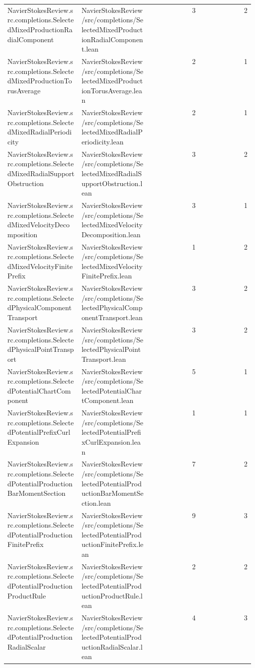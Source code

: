 \begin{longtable}{p{0.30\linewidth}p{0.28\linewidth}rr}
NavierStokesReview.src.completions.SelectedMixedProductionRadialComponent & NavierStokesReview/src/completions/SelectedMixedProductionRadialComponent.lean & 3 & 2\\
NavierStokesReview.src.completions.SelectedMixedProductionTorusAverage & NavierStokesReview/src/completions/SelectedMixedProductionTorusAverage.lean & 2 & 1\\
NavierStokesReview.src.completions.SelectedMixedRadialPeriodicity & NavierStokesReview/src/completions/SelectedMixedRadialPeriodicity.lean & 2 & 1\\
NavierStokesReview.src.completions.SelectedMixedRadialSupportObstruction & NavierStokesReview/src/completions/SelectedMixedRadialSupportObstruction.lean & 3 & 2\\
NavierStokesReview.src.completions.SelectedMixedVelocityDecomposition & NavierStokesReview/src/completions/SelectedMixedVelocityDecomposition.lean & 3 & 1\\
NavierStokesReview.src.completions.SelectedMixedVelocityFinitePrefix & NavierStokesReview/src/completions/SelectedMixedVelocityFinitePrefix.lean & 1 & 2\\
NavierStokesReview.src.completions.SelectedPhysicalComponentTransport & NavierStokesReview/src/completions/SelectedPhysicalComponentTransport.lean & 3 & 2\\
NavierStokesReview.src.completions.SelectedPhysicalPointTransport & NavierStokesReview/src/completions/SelectedPhysicalPointTransport.lean & 3 & 2\\
NavierStokesReview.src.completions.SelectedPotentialChartComponent & NavierStokesReview/src/completions/SelectedPotentialChartComponent.lean & 5 & 1\\
NavierStokesReview.src.completions.SelectedPotentialPrefixCurlExpansion & NavierStokesReview/src/completions/SelectedPotentialPrefixCurlExpansion.lean & 1 & 1\\
NavierStokesReview.src.completions.SelectedPotentialProductionBarMomentSection & NavierStokesReview/src/completions/SelectedPotentialProductionBarMomentSection.lean & 7 & 2\\
NavierStokesReview.src.completions.SelectedPotentialProductionFinitePrefix & NavierStokesReview/src/completions/SelectedPotentialProductionFinitePrefix.lean & 9 & 3\\
NavierStokesReview.src.completions.SelectedPotentialProductionProductRule & NavierStokesReview/src/completions/SelectedPotentialProductionProductRule.lean & 2 & 2\\
NavierStokesReview.src.completions.SelectedPotentialProductionRadialScalar & NavierStokesReview/src/completions/SelectedPotentialProductionRadialScalar.lean & 4 & 3\\

\end{longtable}
